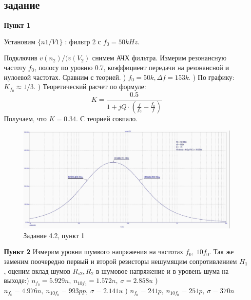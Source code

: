 \documentclass[a4paper, 14pt]{extarticle}%
\begin{document}
\subsection{задание}
\textbf{Пункт 1}
\newline

Установим $\{n1/V1\}$ : фильтр 2 с $f_0 = 50kHz$.
\newline

Подключив $v(n_2)/(v(V_2)$ снимем АЧХ фильтра. Измерим резонансную частоту $f_0$, полосу по уровню 0.7, коэффициент передачи на резонансной и нулоевой частотах. 
\newline
Сравним с теорией.
) $f_0 = 50k, \Delta f = 153k$.
) По графику: $K_{f_0} \approx 1/3$.
) Теоретический расчет по формуле:
\newline
\[ K = \frac{0.5}{1 + jQ\cdot(\frac{f}{f_0} - \frac{f_0}{f})}\]
\newline
Получаем, что $K = 0.34$.
\newline
С теорией совпало.


\begin{figure}[h!]
			\centering
			\includegraphics[width=1.1\linewidth]{4/4_2_2.jpg}
			\caption{Задание 4.2, пункт 1}
			\label{A}
\end{figure}


\textbf{Пункт 2}
\newline
Измерим уровни шумвого напряжения на частотах $f_0, \: 10f_0$. Так же заменим поочередно первый и второй резисторы нешумящим сопротивлением $H_1$, оценим вклад шумов $R_{s2}, R_2$ в шумовое напряжение и в уровень шума на выходе:) $n_{f_0} = 5.929n, \: n_{10f_0} = 1.572n, \: \sigma = 2.858u$
) $n_{f_0} = 4.976n, \: n_{10f_0} = 993pp, \: \sigma = 2.141u$
) $n_{f_0} = 241p, \: n_{10f_0} = 251p, \: \sigma = 370n$
\end{document}

